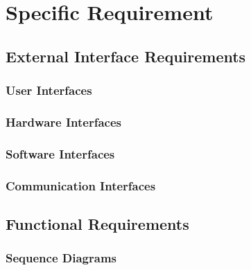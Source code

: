 \section{Specific Requirement}

\subsection{External Interface Requirements}

\subsubsection{User Interfaces}

\subsubsection{Hardware Interfaces}

\subsubsection{Software Interfaces}

\subsubsection{Communication Interfaces}

\subsection{Functional Requirements}

    \subsubsection{Sequence Diagrams}
    
